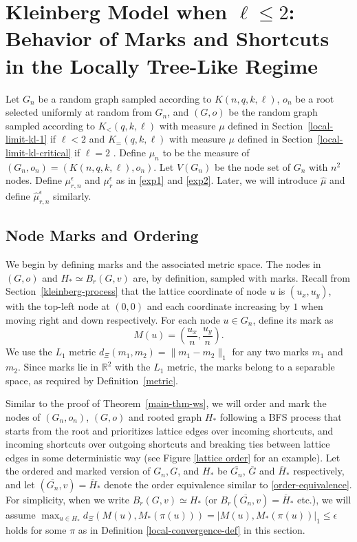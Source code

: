 \documentclass[10pt]{amsart}
\begin{document}
\section{Kleinberg Model when $\ell\leq2$: \\ Behavior of Marks and Shortcuts in the Locally Tree-Like Regime} \label{proof-main-thm-kl-1}

Let $G_n$ be a random graph sampled according to $K(n, q, k, \ell)$, $o_n$ be a root selected uniformly at random from $G_n$, and $(G, o)$ be the random graph sampled according to $K_{<}(q, k, \ell)$  with measure $\mu$ defined in Section~\ref{local-limit-kl-1} if $\ell < 2$ and $K_{=}(q, k, \ell)$  with measure $\mu$ defined in Section~\ref{local-limit-kl-critical} if $\ell = 2$ . Define $\mu_n$ to be the measure of $(G_n, o_n) = (K(n, q, k, \ell), o_n)$. Let $V(G_n)$ be the node set of $G_n$ with $n^2$ nodes. 
Define $\mu_{r,n}^{\epsilon}$ and $\mu_r^{\epsilon}$ as in \eqref{exp1} and \eqref{exp2}. Later, we will introduce $\hat{\mu}$ and define $\hat{\mu}_{r, n}^{\epsilon}$ similarly. 

\subsection{Node Marks and Ordering} \label{sec:node-marks-ordering}
We begin by defining marks and the associated metric space. The nodes in \((G, o)\) and \(H_* \simeq B_r(G,v)\) are, by definition, sampled with marks. Recall from Section~\ref{kleinberg-process} that the lattice coordinate of node \(u\) is \((u_x, u_y)\), with the top-left node at \((0,0)\) and each coordinate increasing by \(1\) when moving right and down respectively. For each node \(u \in G_n\), define its mark as
\[
M(u) = \left(\frac{u_x}{n}, \frac{u_y}{n}\right).
\]
We use the \(L_1\) metric $d_\Xi(m_1, m_2) = \|m_1 - m_2\|_1$ for any two marks $m_1$ and $m_2$. Since marks lie in \(\mathbb{R}^2\) with the \(L_1\) metric, the marks belong to a separable space, as required by Definition~\ref{metric}.

Similar to the proof of Theorem~\ref{main-thm-ws}, we will order and mark the nodes of $(G_n,o_n)$, $(G,o)$ and rooted graph $H_*$ following a BFS process that starts from the root and prioritizes lattice edges over incoming shortcuts, and incoming shortcuts over outgoing shortcuts and breaking ties between lattice edges in some deterministic way (see Figure \ref{lattice order} for an example). Let the ordered and marked version of $G_n, G$, and $H_*$ be $\overline{G_n}$, $\overline{G}$ and $\overline{H}_*$ respectively, and let $(\overline{G_n},v) = \overline{H}_*$ denote the order equivalence similar to \eqref{order-equivalence}. For simplicity, when we write $B_r(G,v)\simeq H_*$ (or $B_r(\overline{G_n},v) = \overline{H}_*$ etc.), we will assume $\max_{u\in H_*} d_\Xi(M(u),M_*(\pi(u))) = |M(u),M_*(\pi(u))|_1 \leq \epsilon$ holds for some $\pi$ as in Definition \ref{local-convergence-def} in this section.
\end{document}
